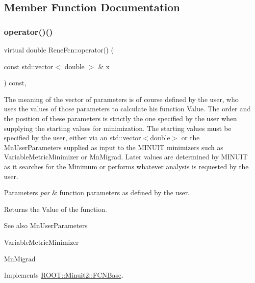 \subsection{Member Function Documentation}
\mbox{\label{classReneFcn_a717a787ca09d586430bf5dc1d51b7ab1}} 
\subsubsection{\texorpdfstring{operator()()}{operator()()}\hspace{0.1cm}{\footnotesize\ttfamily [1/2]}}
{\footnotesize\ttfamily virtual double Rene\+Fcn\+::operator() (\begin{DoxyParamCaption}\item[{const std\+::vector$<$ double $>$ \&}]{x }\end{DoxyParamCaption}) const\hspace{0.3cm}{\ttfamily [inline]}, {\ttfamily [virtual]}}

The meaning of the vector of parameters is of course defined by the user, who uses the values of those parameters to calculate his function Value. The order and the position of these parameters is strictly the one specified by the user when supplying the starting values for minimization. The starting values must be specified by the user, either via an std\+::vector$<$double$>$ or the Mn\+User\+Parameters supplied as input to the M\+I\+N\+U\+IT minimizers such as Variable\+Metric\+Minimizer or Mn\+Migrad. Later values are determined by M\+I\+N\+U\+IT as it searches for the Minimum or performs whatever analysis is requested by the user.


\begin{DoxyParams}{Parameters}
{\em par} & function parameters as defined by the user.\\
\hline
\end{DoxyParams}
\begin{DoxyReturn}{Returns}
the Value of the function.
\end{DoxyReturn}
\begin{DoxySeeAlso}{See also}
Mn\+User\+Parameters 

Variable\+Metric\+Minimizer 

Mn\+Migrad 
\end{DoxySeeAlso}


Implements \mbox{\hyperlink{classROOT_1_1Minuit2_1_1FCNBase_ae4a86bd94d0d0f5ca6fc8f8ab2bb43cd}{R\+O\+O\+T\+::\+Minuit2\+::\+F\+C\+N\+Base}}.


